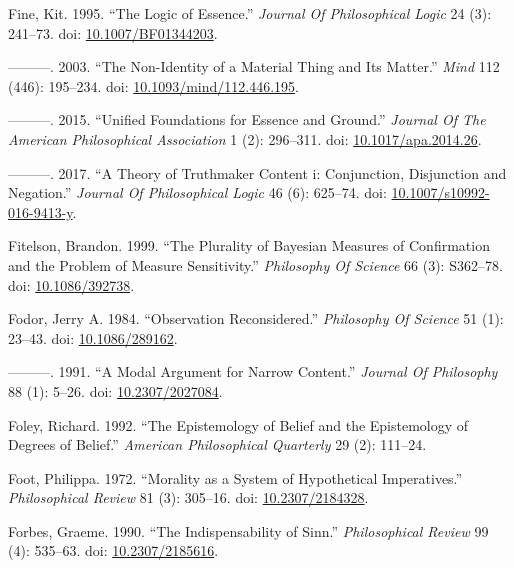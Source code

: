 \documentclass[
  10pt,
  letterpaper,
  DIV=11,
  numbers=noendperiod,
  twoside]{scrartcl}
\newlength{\cslhangindent}
\newenvironment{CSLReferences}[2] %
 {\begin{list}{}{%
  \setlength{\itemindent}{0pt}
  \setlength{\leftmargin}{0pt}
  \setlength{\parsep}{0pt}
  \ifodd #1
   \setlength{\leftmargin}{\cslhangindent}
   \setlength{\itemindent}{-1\cslhangindent}
  \fi
  \setlength{\itemsep}{#2\baselineskip}}}
 {\end{list}}
\begin{document}
\begin{CSLReferences}{1}{0}
Fine, Kit. 1995. {``The Logic of Essence.''} \emph{Journal Of
Philosophical Logic} 24 (3): 241--73. doi:
\href{https://doi.org/10.1007/BF01344203}{10.1007/BF01344203}.

---------. 2003. {``The Non-Identity of a Material Thing and Its
Matter.''} \emph{Mind} 112 (446): 195--234. doi:
\href{https://doi.org/10.1093/mind/112.446.195}{10.1093/mind/112.446.195}.

---------. 2015. {``Unified Foundations for Essence and Ground.''}
\emph{Journal Of The American Philosophical Association} 1 (2):
296--311. doi:
\href{https://doi.org/10.1017/apa.2014.26}{10.1017/apa.2014.26}.

---------. 2017. {``A Theory of Truthmaker Content i: Conjunction,
Disjunction and Negation.''} \emph{Journal Of Philosophical Logic} 46
(6): 625--74. doi:
\href{https://doi.org/10.1007/s10992-016-9413-y}{10.1007/s10992-016-9413-y}.

Fitelson, Brandon. 1999. {``The Plurality of Bayesian Measures of
Confirmation and the Problem of Measure Sensitivity.''} \emph{Philosophy
Of Science} 66 (3): S362--78. doi:
\href{https://doi.org/10.1086/392738}{10.1086/392738}.

Fodor, Jerry A. 1984. {``Observation Reconsidered.''} \emph{Philosophy
Of Science} 51 (1): 23--43. doi:
\href{https://doi.org/10.1086/289162}{10.1086/289162}.

---------. 1991. {``A Modal Argument for Narrow Content.''}
\emph{Journal Of Philosophy} 88 (1): 5--26. doi:
\href{https://doi.org/10.2307/2027084}{10.2307/2027084}.

Foley, Richard. 1992. {``The Epistemology of Belief and the Epistemology
of Degrees of Belief.''} \emph{American Philosophical Quarterly} 29 (2):
111--24.

Foot, Philippa. 1972. {``Morality as a System of Hypothetical
Imperatives.''} \emph{Philosophical Review} 81 (3): 305--16. doi:
\href{https://doi.org/10.2307/2184328}{10.2307/2184328}.

Forbes, Graeme. 1990. {``The Indispensability of Sinn.''}
\emph{Philosophical Review} 99 (4): 535--63. doi:
\href{https://doi.org/10.2307/2185616}{10.2307/2185616}.


\end{CSLReferences}
\end{document}
